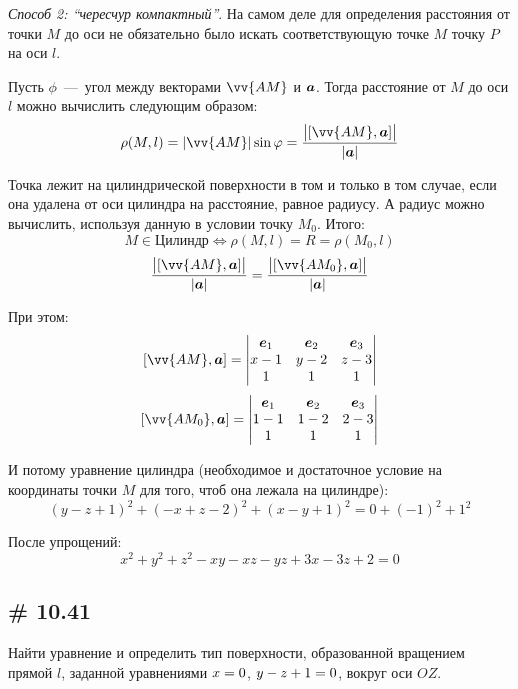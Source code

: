 \documentclass[a4paper,12pt]{article}
\begin{document}
\begin{solution}
    \medskip
    
    \emph{Способ 2: ``чересчур компактный''}.
    На самом деле для определения расстояния от точки $M$ до оси не обязательно было искать соответствующую точке $M$ точку $P$ на оси $l$.
    
    Пусть $\phi$~---~угол между векторами $\vv{AM}$ и $\boldsymbol a$.
    Тогда расстояние от $M$ до оси $l$ можно вычислить следующим образом:
    \[
      \rho(M, l) = |\vv{AM}| \sin\phi
        = \frac{\bigl|[\vv{AM}, \bds a]\bigr|}{|\bds a|}
    \]
    
    Точка лежит на цилиндрической поверхности в том и только в том случае, если она удалена от оси цилиндра на расстояние, равное радиусу.
    А радиус можно вычислить, используя данную в условии точку $M_0$.
    Итого:
    \[
      M \in \mbox{Цилиндр} \Leftrightarrow \rho(M, l) = R = \rho(M_0, l)
    \]
    \[
      \frac{\bigl|[\vv{AM}, \bds a]\bigr|}{|\bds a|} = \frac{\bigl|[\vv{AM_0}, \bds a]\bigr|}{|\bds a|}
    \]
    
    При этом:
    \[
      [\vv{AM}, \bds a] = \begin{vmatrix}
        \bds e_1 & \bds e_2 & \bds e_3\\
        x - 1    & y - 2    & z - 3\\
        1        & 1        & 1
      \end{vmatrix}
    \]
    \[
      [\vv{AM_0}, \bds a] = \begin{vmatrix}
        \bds e_1 & \bds e_2 & \bds e_3\\
        1 - 1    & 1 - 2    & 2 - 3\\
        1        & 1        & 1
      \end{vmatrix}
    \]
    
    И потому уравнение цилиндра (необходимое и достаточное условие на координаты точки $M$ для того, чтоб она лежала на цилиндре):
    \[
      (y - z + 1)^2 + (-x + z - 2)^2 + (x - y + 1)^2 = 0 + (-1)^2 + 1^2
    \]
    
    После упрощений:
    \[
      x^2 + y^2 + z^2 - xy - xz - yz + 3x - 3z + 2 = 0
    \]
  \end{solution}
  
  
  \subsection{\# 10.41}
  
  Найти уравнение и определить тип поверхности, образованной вращением прямой $l$, заданной уравнениями $x \hm= 0$, $y \hm- z \hm+ 1 \hm= 0$, вокруг оси $OZ$.
  
\end{document}
